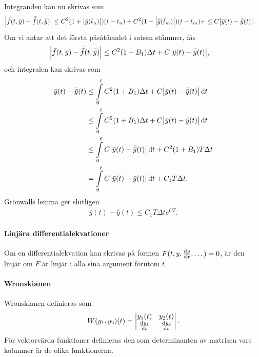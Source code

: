 Integranden kan nu skrivas som
\begin{align*}
	\abs{\bar{f}(t, \bar{y}) - \bar{\bar{f}}(t, \bar{\bar{y}})} &\leq C^{2}(1 + \abs{\bar{y}(\bar{t}_{n})})(t - t_{n}) + C^{2}(1 + \abs{\bar{\bar{y}}(\bar{\bar{t}}_{m})})(t - t_{m}) + \leq C\abs{\bar{y}(t) - \bar{\bar{y}}(t)}.
\end{align*}
Om vi antar att det första påsåtåendet i satsen stämmer, fås
\begin{align*}
	\abs{\bar{f}(t, \bar{y}) - \bar{\bar{f}}(t, \bar{\bar{y}})} &\leq C^{2}(1 + B_{1})\Delta t + C\abs{\bar{y}(t) - \bar{\bar{y}}(t)},
\end{align*}
och integralen kan skrivas som
\begin{align*}
	\bar{y}(t) - \bar{\bar{y}}(t) &\leq \int\limits_{0}^{t}C^{2}(1 + B_{1})\Delta t + C\abs{\bar{y}(t) - \bar{\bar{y}}(t)}\dd{t} \\
	                              &\leq \int\limits_{0}^{t}C^{2}(1 + B_{1})\Delta t + C\abs{\bar{y}(t) - \bar{\bar{y}}(t)}\dd{t} \\
	                              &\leq \int\limits_{0}^{t}C\abs{\bar{y}(t) - \bar{\bar{y}}(t)}\dd{t} + C^{2}(1 + B_{1})T\Delta t \\
	                              &= \int\limits_{0}^{t}C\abs{\bar{y}(t) - \bar{\bar{y}}(t)}\dd{t} + C_{1}T\Delta t.
\end{align*}
Grönwalls lemma ger slutligen
\begin{align*}
	\bar{y}(t) - \bar{\bar{y}}(t) \leq C_{1}T\Delta te^{CT}.
\end{align*}

\paragraph{Linjära differentialekvationer}
Om en differentialekvation kan skrivas på formen $F(t, y, \dv{y}{x}, \dots) = 0$, är den linjär om $F$ är linjär i alla sina argument förutom $t$.

\paragraph{Wronskianen}
Wronskianen definieras som
\begin{align*}
	W(y_1, y_2)(t) = \mdet{y_{1}(t) & y_{2}(t) \\ \deval{y_{1}}{t}{t} & \deval{y_{2}}{t}{t}}.
\end{align*}
För vektorvärda funktioner definieras den som determinanten av matrisen vars kolumner är de olika funktionerna.

